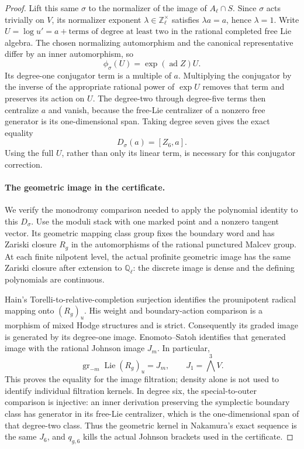 \begin{proof}
Lift this same \(\sigma\) to the normalizer of the image
of \(A_\ell\cap S\).  Since \(\sigma\) acts trivially on \(V\),
its normalizer exponent \(\lambda\in\mathbb Z_\ell^\times\)
satisfies \(\lambda a=a\), hence \(\lambda=1\).
Write \(U=\log u'=a+\text{terms of degree at least two}\)
in the rational completed free Lie algebra.
The chosen normalizing automorphism and the canonical
representative differ by an inner automorphism, so
\[
                 \phi_\sigma(U)=\exp(\operatorname{ad}Z)U.
\]
Its degree-one conjugator term is a multiple of \(a\).
Multiplying the conjugator by the inverse of the appropriate
rational power of \(\exp U\) removes that term and preserves
its action on \(U\).
The degree-two through degree-five terms then centralize \(a\)
and vanish, because the free-Lie centralizer of a nonzero
free generator is its one-dimensional span.
Taking degree seven gives the exact equality
\begin{equation}\label{eq:geo-normalizer-tangency}
                         D_\sigma(a)=[Z_6,a].
\end{equation}
Using the full \(U\), rather than only its linear term,
is necessary for this conjugator correction.

\paragraph{The geometric image in the certificate.}
We verify the monodromy comparison needed to apply the
polynomial identity to this \(D_\sigma\).
Use the moduli stack with one marked point and a nonzero
tangent vector.  Its geometric mapping class group fixes
the boundary word and has Zariski closure \(R_g\) in
the automorphisms of the rational punctured Malcev group.
At each finite nilpotent level, the actual profinite
geometric image has the same Zariski closure after
extension to \(\mathbb Q_\ell\): the discrete image is
dense and the defining polynomials are continuous.

Hain's Torelli-to-relative-completion surjection
\cite[Theorem 3.4, p.~605]{Hain1997} identifies the
prounipotent radical mapping onto \((R_g)_u\).
His weight and boundary-action comparison
\cite[Theorem 4.10, p.~611; Remark 4.11, p.~613;
\S14.4, p.~643]{Hain1997} is a morphism of mixed
Hodge structures and is strict.
Consequently its graded image is generated by its
degree-one image.  Enomoto--Satoh
\cite[Theorem 3.5 and Proposition 3.6, p.~640]{EnomotoSatoh2014}
identifies that generated image with the rational Johnson
image \(J_m\).  In particular,
\[
              \operatorname{gr}_{-m}\operatorname{Lie}(R_g)_u=J_m,
              \qquad J_1=\bigwedge^3V.
\]
This proves the equality for the image filtration; density
alone is not used to identify individual filtration kernels.
In degree six, the special-to-outer comparison is injective:
an inner derivation preserving the symplectic boundary class
has generator in its free-Lie centralizer, which is the
one-dimensional span of that degree-two class.
Thus the geometric kernel in Nakamura's exact sequence is
the same \(J_6\), and \(q_{g,6}\) kills the actual Johnson
brackets used in the certificate.


\end{proof}
